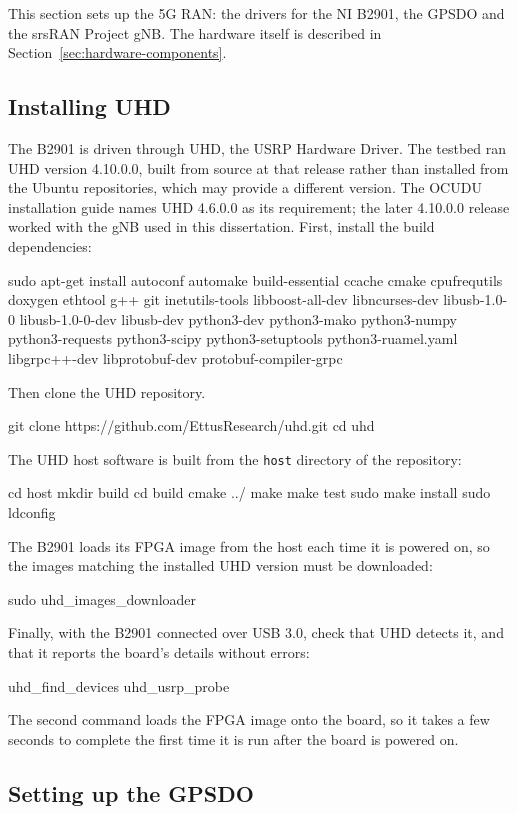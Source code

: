 This section sets up the 5G \gls{RAN}: the drivers for the NI B2901, the \gls{GPSDO} and the srsRAN Project \gls{gNB}. The hardware itself is described in Section~\ref{sec:hardware-components}.

\subsection{Installing UHD}
\label{sec:app-uhd}

The B2901 is driven through UHD, the USRP Hardware Driver. The testbed ran UHD version 4.10.0.0, built from source at that release rather than installed from the Ubuntu repositories, which may provide a different version.
The OCUDU installation guide names UHD 4.6.0.0 as its requirement; the later 4.10.0.0 release worked with the \gls{gNB} used in this dissertation. First, install the build dependencies:
\begin{code}
sudo apt-get install autoconf automake build-essential ccache cmake cpufrequtils doxygen ethtool g++ git inetutils-tools libboost-all-dev libncurses-dev libusb-1.0-0 libusb-1.0-0-dev libusb-dev python3-dev python3-mako python3-numpy python3-requests python3-scipy python3-setuptools python3-ruamel.yaml libgrpc++-dev libprotobuf-dev protobuf-compiler-grpc
\end{code}
Then clone the UHD repository.
\begin{code}
git clone https://github.com/EttusResearch/uhd.git
cd uhd
\end{code}
The UHD host software is built from the \texttt{host} directory of the repository:
\begin{code}
cd host
mkdir build
cd build
cmake ../
make
make test
sudo make install
sudo ldconfig
\end{code}
The B2901 loads its \gls{FPGA} image from the host each time it is powered on, so the images matching the installed UHD version must be downloaded:
\begin{code}
sudo uhd_images_downloader
\end{code}
Finally, with the B2901 connected over USB 3.0, check that UHD detects it, and that it reports the board's details without errors:
\begin{code}
uhd_find_devices
uhd_usrp_probe
\end{code}
The second command loads the \gls{FPGA} image onto the board, so it takes a few seconds to complete the first time it is run after the board is powered on.

\subsection{Setting up the GPSDO}
\label{sec:app-gpsdo}

